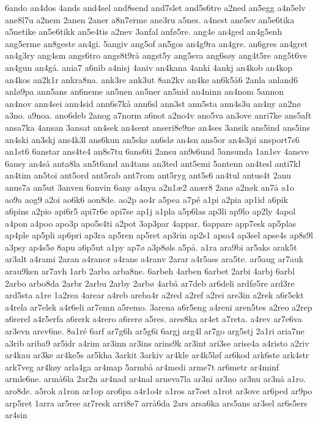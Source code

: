 {6ando
an4dos
4ands
and4sel
and8send
and7slet
and5s6tre
a2ned
an5egg
a4n5elv
ane8l7u
a2nem
2anen
2aner
a8n7erme
ane3ru
a5nes.
a4nest
ane5sv
an5e6tika
a5netike
an5e6tikk
an5e4tis
a2nev
3anfal
anfø5re.
ang4e
an4ged
an4g5enh
ang5erme
an8geste
an4gi.
5angiv
ang5of
an5gos
an4g9ra
an4gre.
an6gres
an4gret
an4g3ry
ang4sm
angs6tro
angs8t9rå
angst5y
ang5sva
ang6søy
ang4t5re
ang5t6ve
an4gun
an4gå.
ania7
a6nib
a4nisj
4aniv
an4kana
4anki
4ankj
an4kob
an4kop
an4kos
an2k1r
ankra8na.
ank3re
ank3ut
8an2kv
an4kø
an6k5å6
2anla
anland6
anlø9pa
ann5ans
an6neme
an5nen
an5ner
an5nid
an4ninn
an4nom
5annon
an4nov
ann4sei
ann4sid
ann6s7kå
ann6sl
ann3st
ann5sta
ann4s3u
an4ny
an2nø
a3no.
a9noa.
ano6deb
2anog
a7norm
a6not
a2no4v
ano5va
an3ove
anri7ke
ans5aft
ansa7ka
4ansan
3ansat
an4sek
an4sent
anseri8e9ne
an4ses
3ansik
ans5ind
ans5ins
an4ski
an3skj
ans4k3l
ans6kun
an5skø
an6slø
an4sn
ans5or
an4s3pi
ansport7s6
an1st6
6anstar
ans4te4
an8s7tu
6ans6ti
2ansu
an9s6und
5ansunda
1an1sv
4ansve
6ansy
an4så
anta8la
an5t6and
an4tans
an3ted
ant5emi
5antenn
an4tesl
anti7kl
an4tim
an5toi
ant5ord
ant5rab
ant7rom
ant5ryg
ant5s6
an4tul
antus4t
2anu
anus7a
an5ut
3anven
6anvin
6any
a4nya
a2n1æ2
anær8
2anø
a2nøk
an7å
a1o
ao9a
aog9
a2oi
ao6k6
aon8de.
ao2p
ao4r
a5pea
a7pé
a1pi
a2pia
ap1id
a6pik
a6pins
a2pio
api6r5
api7r6e
api7se
ap1j
a1pla
a5p6las
ap3li
ap9lo
ap2ly
4apol
a4pon
a4poo
apo3p
apo5s4ti
a2pot
3ap3par
4appar.
6appare
app7esk
ap5plas
ap4ple
ap5pli
ap6pri
ap3ra
ap5ren
ap5ret
ap3rin
ap2s1
apsa4
ap3sel
apse4s
ap8s9l
a3psy
ap4s5ø
8apu
a6p5ut
a1py
ap7ø
a3p8øls
a5på.
a1ra
ara9bi
ar5aks
arak5t
ar3alt
a4rami
2aran
a4ranor
a4rans
a4ranv
2arar
a4r5ass
ara5te.
ar5aug
ar7auk
arau9ken
ar7avh
1arb
2arba
arba8ne.
6arbeh
4arben
6arbet
2arbi
4arbj
6arbl
2arbo
arbo8da
2arbr
2arbu
2arby
2arbø
4arbå
ar7deb
ar6deli
ardfø5re
ard3re
ard5sta
a1re
1a2rea
4arear
a4reb
areba4r
a2red
a2ref
a2rei
are3in
a2rek
a6r5ekt
a4rela
ar7elek
a4r6eli
ar7emn
a5remo.
3arena
a6r5eng
a4reni
aren5tes
a2reo
a2rep
a6rerel
a4r5erfa
a6rerk
a4rero
a6rerø
a5res.
ares8ka
ar4et
a7reta.
a4rev
ar7e6va
ar3evn
arev6ne.
8a1ré
6arf
ar7g6h
ar5g6i
6argj
arg4l
ar7go
arg5stj
2a1ri
aria7ne
a3rib
ariba9
ar5idr
a4rim
ar3inn
ar3ins
arins9k
ar3int
ari3se
arise4a
a4risto
a2riv
ar4kau
ar3ke
ar4ke5s
ar5kha
3arkit
3arkiv
ar4kle
ar4k5løf
ar6kod
ark6ste
ark4str
ark7veg
ar4køy
arla4ga
ar4map
5armbå
ar4medi
arme7t
ar6metr
ar4minf
armle6ne.
armå6la
2ar2n
ar4nad
ar4nal
arneva7la
ar3ni
ar3no
ar3nu
ar3nå
a1ro.
aro8de.
a5rok
a1ron
ar1op
aro6pa
a4r1o4r
a1ros
ar7ost
a1rot
ar3ove
ar6ped
ar9po
arp5ret
1arra
ar5ree
ar7resk
arri8e7
arrå6da
2ars
arsa6ka
ars5ans
ar3sel
ar6s5ers
ar4sin
}
